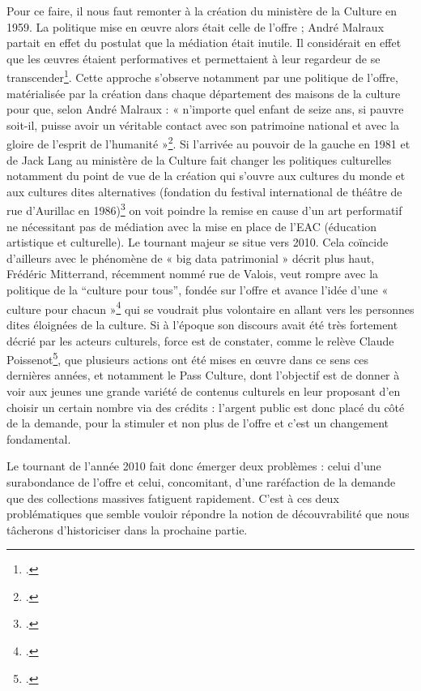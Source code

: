 Pour ce faire, il nous faut remonter à la création du ministère de la Culture en 1959. La politique mise en œuvre alors était celle de l’offre ; André Malraux partait en effet du postulat que la médiation était inutile. Il considérait en effet que les œuvres étaient performatives et permettaient à leur regardeur de se transcender\footcite[§3]{godin2011}. Cette approche s'observe notamment par une politique de l’offre, matérialisée par la création dans chaque département des maisons de la culture pour que, selon André Malraux : « n’importe quel enfant de seize ans, si pauvre soit-il, puisse avoir un véritable contact avec son patrimoine national et avec la gloire de l’esprit de l’humanité »\footcite[Entrée \enquote{(cité dans) maison de la culture}]{waresquiel2001}. Si l’arrivée au pouvoir de la gauche en 1981 et de Jack Lang au ministère de la Culture fait changer les politiques culturelles notamment du point de vue de la création qui s’ouvre aux cultures du monde et aux cultures dites alternatives (fondation du festival international de théâtre de rue d’Aurillac en 1986)\footcite{waresquiel2001} on voit poindre la remise en cause d’un art performatif ne nécessitant pas de médiation avec la mise en place de l’EAC (éducation artistique et culturelle). Le tournant majeur se situe vers 2010. Cela coïncide d’ailleurs avec le phénomène de « big data patrimonial » décrit plus haut, Frédéric Mitterrand, récemment nommé rue de Valois, veut rompre avec la politique de la \enquote{culture pour tous}, fondée sur l’offre et avance l’idée d’une « culture pour chacun »\footcite{2010} qui se voudrait plus volontaire en allant vers les personnes dites éloignées de la culture. Si à l’époque son discours avait été très fortement décrié par les acteurs culturels, force est de constater, comme le relève Claude Poissenot\footcite{zotero-269}, que plusieurs actions ont été mises en œuvre dans ce sens ces dernières années, et notamment le Pass Culture, dont l’objectif est de donner à voir aux jeunes une grande variété de contenus culturels en leur proposant d’en choisir un certain nombre via des crédits : l’argent public est donc placé du côté de la demande, pour la stimuler et non plus de l’offre et c’est un changement fondamental.

Le tournant de l’année 2010 fait donc émerger deux problèmes : celui d’une surabondance de l’offre et celui, concomitant, d’une raréfaction de la demande que des collections massives fatiguent rapidement. C’est à ces deux problématiques que semble vouloir répondre la notion de découvrabilité que nous tâcherons d’historiciser dans la prochaine partie.


